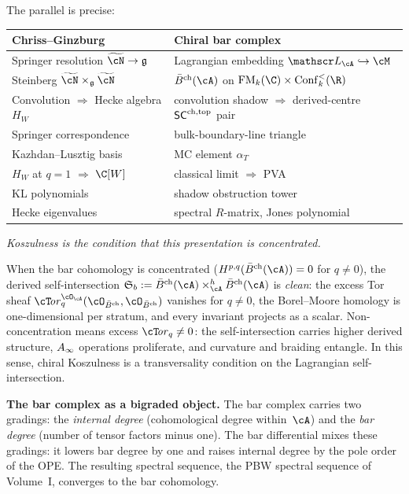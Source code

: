 The parallel is precise:
\begin{center}
\small
\renewcommand{\arraystretch}{1.15}
\begin{tabular}{ll}
\textbf{Chriss--Ginzburg} & \textbf{Chiral bar complex} \\ \hline
Springer resolution $\widetilde{\cN} \to \fg$
 & Lagrangian embedding $\cL_\cA \hookrightarrow \cM$ \\[2pt]
Steinberg $\widetilde{\cN} \times_{\fg} \widetilde{\cN}$
 & $\barBch(\cA)$ on $\FM_k(\C) \times \Conf_k^{<}(\R)$ \\[2pt]
Convolution $\Rightarrow$ Hecke algebra $H_W$
 & convolution shadow $\Rightarrow$ derived-centre $\mathsf{SC}^{\mathrm{ch,top}}$ pair \\[2pt]
Springer correspondence
 & bulk-boundary-line triangle \\[2pt]
Kazhdan--Lusztig basis
 & MC element $\alpha_T$ \\[2pt]
$H_W$ at $q=1$ $\Rightarrow$ $\C[W]$
 & classical limit $\Rightarrow$ PVA \\[2pt]
KL polynomials
 & shadow obstruction tower \\[2pt]
Hecke eigenvalues
 & spectral $R$-matrix, Jones polynomial
\end{tabular}
\end{center}
\smallskip

\emph{Koszulness is the condition that this presentation is
concentrated.}

When the bar cohomology is concentrated ($H^{p,q}(\barBch(\cA)) = 0$
for $q \neq 0$), the derived self-intersection
$\Steinb_b := \barBch(\cA) \times_\cA^h \barBch(\cA)$
is \emph{clean}: the excess Tor sheaf
$\cT\!\mathit{or}^{\cO_\cA}_q(\cO_{\barBch},\cO_{\barBch})$
vanishes for $q \neq 0$, the Borel--Moore homology is
one-dimensional per stratum, and every invariant projects as
a scalar. Non-concentration means excess $\cT\!\mathit{or}_q
\neq 0$: the self-intersection carries higher derived structure,
$A_\infty$ operations proliferate, and curvature and braiding
entangle. In this sense, chiral Koszulness is a transversality
condition on the Lagrangian self-intersection.

\medskip\noindent\textbf{The bar complex as a bigraded object.}\enspace
The bar complex carries two gradings: the \emph{internal degree}
(cohomological degree within~$\cA$) and the \emph{bar degree}
(number of tensor factors minus one). The bar differential mixes
these gradings: it lowers bar degree by one and raises internal degree
by the pole order of the OPE. The resulting spectral sequence, the
PBW spectral sequence of Volume~I, converges to the bar cohomology.

